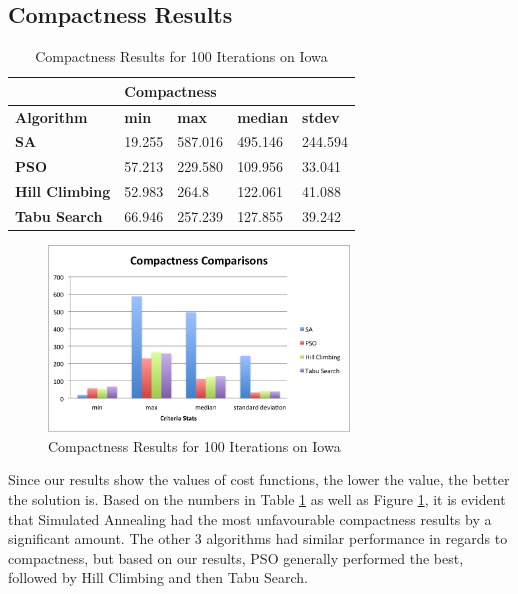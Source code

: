 \documentclass[journal]{IEEEtran}
\begin{document}
\subsection{Compactness Results}

\begin{table}[!h]
\centering
\caption{Compactness Results for 100 Iterations on Iowa}
\label{tab:comp_100iter}
\begin{tabular}{l|llll}
                       & \multicolumn{4}{l}{\textbf{Compactness}}                      \\ \hline
\textbf{Algorithm}     & \textbf{min} & \textbf{max} & \textbf{median} & \textbf{stdev} \\ \hline
\textbf{SA}            & 19.255       & 587.016      & 495.146         & 244.594       \\
\textbf{PSO}           & 57.213       & 229.580      & 109.956         & 33.041         \\
\textbf{Hill Climbing} & 52.983       & 264.8        & 122.061         & 41.088         \\
\textbf{Tabu Search}   & 66.946       & 257.239      & 127.855         & 39.242            
\end{tabular}
\end{table}

\begin{figure}[h!]
    \includegraphics[width=8cm]{images/compactness_graph.png}
    \centering
    \caption{Compactness Results for 100 Iterations on Iowa}
    \label{fig:compactness_results}
\end{figure}

Since our results show the values of cost functions, the lower the value, the better the solution is. Based on the numbers in Table \ref{tab:comp_100iter} as well as Figure \ref{fig:compactness_results}, it is evident that Simulated Annealing had the most unfavourable compactness results by a significant amount. The other 3 algorithms had similar performance in regards to compactness, but based on our results, PSO generally performed the best, followed by Hill Climbing and then Tabu Search. 
\end{document}

